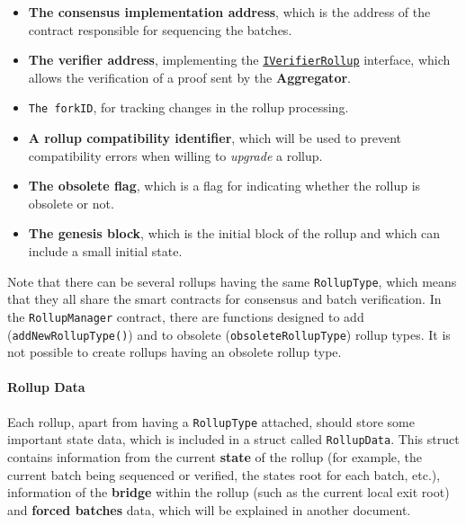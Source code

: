 \begin{itemize}
\item \textbf{The consensus implementation address}, which is the address of the contract responsible for sequencing the batches.
\item \textbf{The verifier address}, implementing the \href{https://github.com/0xPolygonHermez/zkevm-contracts/blob/develop/contracts/interfaces/IVerifierRollup.sol}{\texttt{IVerifierRollup}} interface, which allows the verification of a proof sent by the \textbf{Aggregator}.
\item \texttt{The forkID}, for tracking changes in the rollup processing.
\item \textbf{A rollup compatibility identifier}, which will be used to prevent compatibility errors when willing to \textit{upgrade} a rollup.
\item \textbf{The obsolete flag}, which is a flag for indicating whether the rollup is obsolete or not.
\item \textbf{The genesis block}, which is the initial block of the rollup and which can include a small initial state.
\end{itemize}

Note that there can be several rollups having the same \texttt{RollupType}, which means that they all share the smart contracts for consensus and batch verification. In the \texttt{RollupManager} contract, there are functions designed to add (\texttt{addNewRollupType()}) and to obsolete (\texttt{obsoleteRollupType}) rollup types. It is not possible to create rollups having an obsolete rollup type.


\paragraph*{Rollup Data}

Each rollup, apart from having a \texttt{RollupType} attached, should store some important state data, which is included in a struct called
\texttt{RollupData}. This struct contains information from the current \textbf{state} of the rollup (for example, the current batch being sequenced or verified, the states root for each batch, etc.), information of the \textbf{bridge} within the rollup (such as the current local exit root) and \textbf{forced batches} data, which will be explained in another document.

